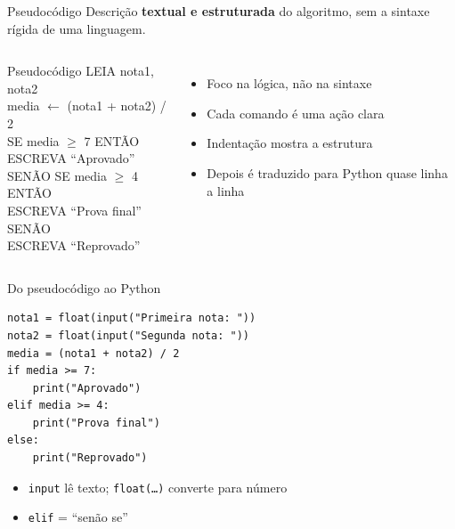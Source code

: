 \documentclass[aspectratio=169,10pt,t]{beamer}
\begin{document}
\begin{frame}{Pseudocódigo}
  Descrição \textbf{textual e estruturada} do algoritmo, sem a sintaxe rígida de uma linguagem.
  \vspace{1ex}
  \begin{columns}[T]
    \begin{block}{Pseudocódigo}
      \ttfamily\footnotesize
      LEIA nota1, nota2\\
      media $\leftarrow$ (nota1 + nota2) / 2\\
      SE media $\ge$ 7 ENTÃO\\
      \hspace*{1em}ESCREVA ``Aprovado''\\
      SENÃO SE media $\ge$ 4 ENTÃO\\
      \hspace*{1em}ESCREVA ``Prova final''\\
      SENÃO\\
      \hspace*{1em}ESCREVA ``Reprovado''
    \end{block}
    \begin{itemize}
      \item Foco na lógica, não na sintaxe
      \item Cada comando é uma ação clara
      \item Indentação mostra a estrutura
      \item Depois é traduzido para Python quase linha a linha
    \end{itemize}
  \end{columns}
\end{frame}

\begin{frame}[fragile]{Do pseudocódigo ao Python}
\begin{lstlisting}
nota1 = float(input("Primeira nota: "))
nota2 = float(input("Segunda nota: "))
media = (nota1 + nota2) / 2
if media >= 7:
    print("Aprovado")
elif media >= 4:
    print("Prova final")
else:
    print("Reprovado")
\end{lstlisting}
  \begin{itemize}
    \item \texttt{input} lê texto; \texttt{float(\ldots)} converte para número
    \item \texttt{elif} = ``senão se''
  \end{itemize}
\end{frame}
\end{document}
